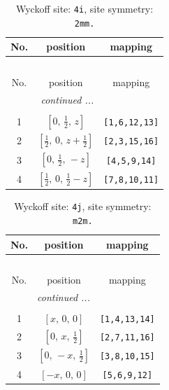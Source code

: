 \documentclass[fleqn,8pt]{jsarticle}
\begin{document}
\renewcommand{\arraystretch}{1.2}
\begin{longtable}{ccc}
\caption{Wyckoff site: {\tt 4i}, site symmetry: {\tt 2mm.}}
 \\
 \hline \hline
No. & position & mapping \\ \hline \endfirsthead

\multicolumn{2}{l}{\tablename\ \thetable{}} \\
 \hline \hline
No. & position & mapping \\ \hline \endhead

 \hline \hline
\multicolumn{2}{r}{\footnotesize\it continued ...} \\ \endfoot

 \hline \hline
\multicolumn{2}{r}{} \\ \endlastfoot

1 & $\left[ 0,\, \frac{1}{2},\, z \right]$ & {\tt [1,6,12,13]} \\ \hline
2 & $\left[ \frac{1}{2},\, 0,\, z + \frac{1}{2} \right]$ & {\tt [2,3,15,16]} \\ \hline
3 & $\left[ 0,\, \frac{1}{2},\, - z \right]$ & {\tt [4,5,9,14]} \\ \hline
4 & $\left[ \frac{1}{2},\, 0,\, \frac{1}{2} - z \right]$ & {\tt [7,8,10,11]} \\
\end{longtable}
\renewcommand{\arraystretch}{1.2}
\begin{longtable}{ccc}
\caption{Wyckoff site: {\tt 4j}, site symmetry: {\tt m2m.}}
 \\
 \hline \hline
No. & position & mapping \\ \hline \endfirsthead

\multicolumn{2}{l}{\tablename\ \thetable{}} \\
 \hline \hline
No. & position & mapping \\ \hline \endhead

 \hline \hline
\multicolumn{2}{r}{\footnotesize\it continued ...} \\ \endfoot

 \hline \hline
\multicolumn{2}{r}{} \\ \endlastfoot

1 & $\left[ x,\, 0,\, 0 \right]$ & {\tt [1,4,13,14]} \\ \hline
2 & $\left[ 0,\, x,\, \frac{1}{2} \right]$ & {\tt [2,7,11,16]} \\ \hline
3 & $\left[ 0,\, - x,\, \frac{1}{2} \right]$ & {\tt [3,8,10,15]} \\ \hline
4 & $\left[ - x,\, 0,\, 0 \right]$ & {\tt [5,6,9,12]} \\
\end{longtable}
\end{document}
